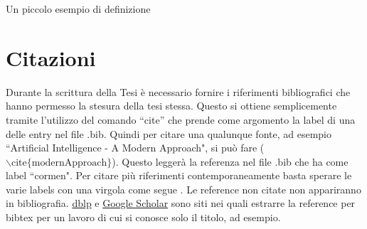 \begin{defn}
	Un piccolo esempio di definizione
\end{defn}

\begin{table}[ht]
	\centering
	\vspace*{2mm}
	\caption{Esempio di tabella}
	\label{tab:perf}
\end{table}


\section{Citazioni}
Durante la scrittura della Tesi è necessario fornire i riferimenti bibliografici che hanno permesso la stesura della tesi stessa.
Questo si ottiene semplicemente tramite l'utilizzo del comando ``cite'' che prende come argomento la label di una delle entry nel file .bib.
Quindi per citare una qualunque fonte, ad esempio ``Artificial Intelligence - A Modern Approach", si può fare \cite{modernApproach} ($\backslash\text{cite}\{\text{modernApproach}\}$).
Questo leggerà la referenza nel file .bib che ha come label ``cormen".
Per citare più riferimenti contemporaneamente basta sperare le varie labels con una virgola come segue \cite{gelfond1998action,modernApproach,durfee1999distributed,de2003resource,allen2009complexity,bernstein2002complexity}.
Le reference non citate non appariranno in bibliografia.
\href{https://dblp.uni-trier.de/}{dblp} e \href{https://scholar.google.com/}{Google Scholar} sono siti nei quali estrarre la reference per bibtex per un lavoro di cui si conosce solo il titolo, ad esempio.
